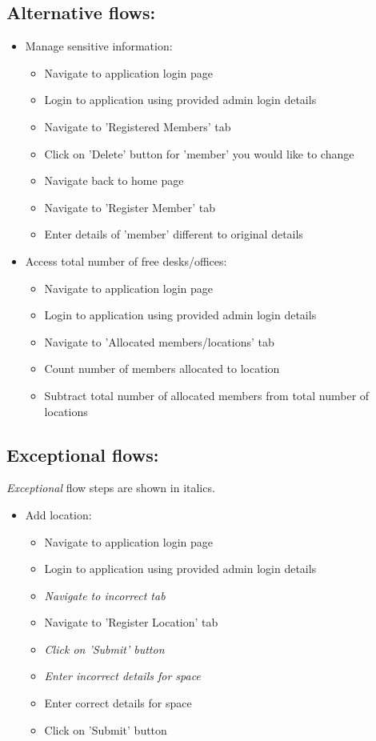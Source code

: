 \documentclass[11pt,a4paper]{article}
\begin{document}
\subsection{Alternative flows:}
\begin{itemize}
  \item Manage sensitive information:
    \begin{itemize}
        \item Navigate to application login page
        \item Login to application using provided admin login details
        \item Navigate to 'Registered Members' tab
        \item Click on 'Delete' button for 'member' you would like to change
        \item Navigate back to home page
        \item Navigate to 'Register Member' tab
        \item Enter details of 'member' different to original details
    \end{itemize}
  \item Access total number of free desks/offices:
    \begin{itemize}
        \item Navigate to application login page
        \item Login to application using provided admin login details
        \item Navigate to 'Allocated members/locations' tab
        \item Count number of members allocated to location
        \item Subtract total number of allocated members from total number of locations
    \end{itemize}
\end{itemize}

\subsection{Exceptional flows:}
\textit{Exceptional} flow steps are shown in italics.
\begin{itemize}
  \item Add location:
    \begin{itemize}
       \item Navigate to application login page
       \item Login to application using provided admin login details
       \item \textit{Navigate to incorrect tab}
       \item Navigate to 'Register Location' tab
       \item \textit{Click on 'Submit' button}
       \item \textit{Enter incorrect details for space}
       \item Enter correct details for space
       \item Click on 'Submit' button
    \end{itemize}
\end{itemize}
\end{document}
